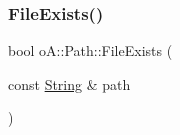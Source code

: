 \mbox{\label{namespaceo_a_1_1_path_af332d947cbb51cf1141c0718169748c3}} 
\subsubsection{\texorpdfstring{File\+Exists()}{FileExists()}}
{\footnotesize\ttfamily bool o\+A\+::\+Path\+::\+File\+Exists (\begin{DoxyParamCaption}\item[{const \mbox{\hyperlink{classo_a_1_1_string}{String}} \&}]{path }\end{DoxyParamCaption})}

